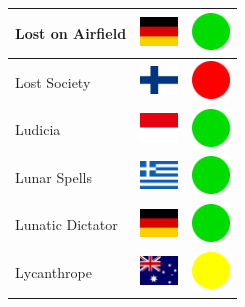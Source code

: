 \documentclass[12pt, a4paper, twoside]{report}
\begin{document}
\begin{center}
\begin{longtable}{|p{5cm}|p{2cm}|p{2cm}|}
 Lost on Airfield                                           & \includegraphics[width=1cm]{../4x3/de} &   \includegraphics[width=1cm]{../likes/y} \\ \hline
 Lost Society                                               & \includegraphics[width=1cm]{../4x3/fi} &   \includegraphics[width=1cm]{../likes/n} \\ \hline
 Ludicia                                                    & \includegraphics[width=1cm]{../4x3/id} &   \includegraphics[width=1cm]{../likes/y} \\ \hline
 Lunar Spells                                               & \includegraphics[width=1cm]{../4x3/gr} &   \includegraphics[width=1cm]{../likes/y} \\ \hline
 Lunatic Dictator                                           & \includegraphics[width=1cm]{../4x3/de} &   \includegraphics[width=1cm]{../likes/y} \\ \hline
 Lycanthrope                                                & \includegraphics[width=1cm]{../4x3/au} &   \includegraphics[width=1cm]{../likes/m} \\ \hline

\end{longtable}
\end{center}
\end{document}
